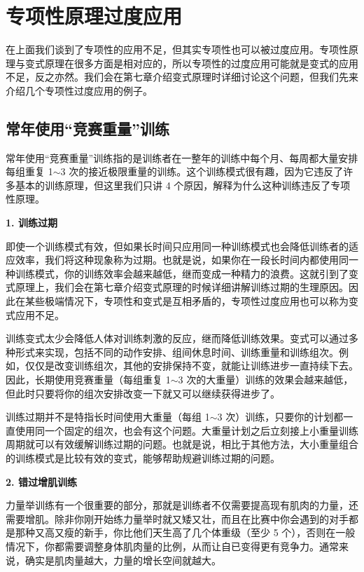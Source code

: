 \documentclass[fontset=fandol, a4paper, 12pt, openright]{ctexbook}
\begin{document}
\section{专项性原理过度应用}

在上面我们谈到了专项性的应用不足，但其实专项性也可以被过度应用。专项性原理与变式原理在很多方面是相对应的，所以专项性的过度应用可能就是变式的应用不足，反之亦然。我们会在第七章介绍变式原理时详细讨论这个问题，但我们先来介绍几个专项性过度应用的例子。

\subsection{常年使用“竞赛重量”训练}

常年使用“竞赛重量”训练指的是训练者在一整年的训练中每个月、每周都大量安排每组重复 1$\sim$3 次的接近极限重量的训练。这个训练模式很有趣，因为它违反了许多基本的训练原理，但这里我们只讲 4 个原因，解释为什么这种训练违反了专项性原理。

\textbf{1. 训练过期}

即使一个训练模式有效，但如果长时间只应用同一种训练模式也会降低训练者的适应效率，我们将这种现象称为过期。也就是说，如果你在一段长时间内都使用同一种训练模式，你的训练效率会越来越低，继而变成一种精力的浪费。这就引到了变式原理上，我们会在第七章介绍变式原理的时候详细讲解训练过期的生理原因。因此在某些极端情况下，专项性和变式是互相矛盾的，专项性过度应用也可以称为变式应用不足。

训练变式太少会降低人体对训练刺激的反应，继而降低训练效果。变式可以通过多种形式来实现，包括不同的动作安排、组间休息时间、训练重量和训练组次。例如，仅仅是改变训练组次，其他的安排保持不变，就能让训练进步一直持续下去。因此，长期使用竞赛重量（每组重复 1$\sim$3 次的大重量）训练的效果会越来越低，但此时只要将你的组次安排改变一下就又可以继续获得进步了。

训练过期并不是特指长时间使用大重量（每组 1$\sim$3 次）训练，只要你的计划都一直使用同一个固定的组次，也会有这个问题。大重量计划之后立刻接上小重量训练周期就可以有效缓解训练过期的问题。也就是说，相比于其他方法，大小重量组合的训练模式是比较有效的变式，能够帮助规避训练过期的问题。

\textbf{2. 错过增肌训练}

力量举训练有一个很重要的部分，那就是训练者不仅需要提高现有肌肉的力量，还需要增肌。除非你刚开始练力量举时就又矮又壮，而且在比赛中你会遇到的对手都是那种又高又瘦的新手，你比他们天生高了几个体重级（至少 5 个），否则在一般情况下，你都需要调整身体肌肉量的比例，从而让自已变得更有竞争力。通常来说，确实是肌肉量越大，力量的增长空间就越大。
\end{document}
